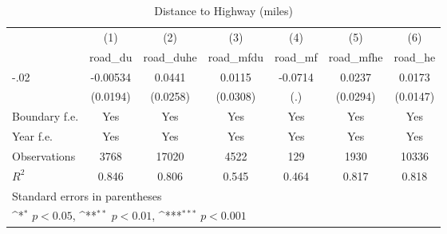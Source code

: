 \begin{table}[htbp]\centering
\def\sym#1{\ifmmode^{#1}\else\(^{#1}\)\fi}
\caption{Distance to Highway (miles)}
\begin{tabular}{l*{6}{c}}
\hline\hline
                    &\multicolumn{1}{c}{(1)}&\multicolumn{1}{c}{(2)}&\multicolumn{1}{c}{(3)}&\multicolumn{1}{c}{(4)}&\multicolumn{1}{c}{(5)}&\multicolumn{1}{c}{(6)}\\
                    &\multicolumn{1}{c}{road\_du}&\multicolumn{1}{c}{road\_duhe}&\multicolumn{1}{c}{road\_mfdu}&\multicolumn{1}{c}{road\_mf}&\multicolumn{1}{c}{road\_mfhe}&\multicolumn{1}{c}{road\_he}\\
\hline
-.02                &    -0.00534         &      0.0441         &      0.0115         &     -0.0714         &      0.0237         &      0.0173         \\
                    &    (0.0194)         &    (0.0258)         &    (0.0308)         &         (.)         &    (0.0294)         &    (0.0147)         \\
[1em]
Boundary f.e.       &         Yes         &         Yes         &         Yes         &         Yes         &         Yes         &         Yes         \\
[1em]
Year f.e.           &         Yes         &         Yes         &         Yes         &         Yes         &         Yes         &         Yes         \\
\hline
Observations        &        3768         &       17020         &        4522         &         129         &        1930         &       10336         \\
\(R^{2}\)           &       0.846         &       0.806         &       0.545         &       0.464         &       0.817         &       0.818         \\
\hline\hline
\multicolumn{7}{l}{\footnotesize Standard errors in parentheses}\\
\multicolumn{7}{l}{\footnotesize \sym{*} \(p<0.05\), \sym{**} \(p<0.01\), \sym{***} \(p<0.001\)}\\
\end{tabular}
\end{table}
